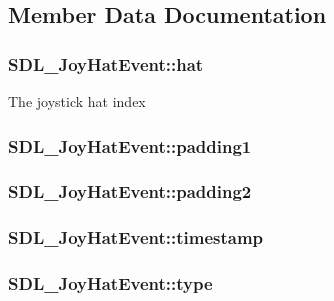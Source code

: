 \subsection{Member Data Documentation}
\hypertarget{struct_s_d_l___joy_hat_event_ab1b54a6d1091e583e856f86b5af1e2f6}{
\subsubsection[{hat}]{ S\-D\-L\-\_\-\-Joy\-Hat\-Event\-::hat}}\label{struct_s_d_l___joy_hat_event_ab1b54a6d1091e583e856f86b5af1e2f6}
The joystick hat index \hypertarget{struct_s_d_l___joy_hat_event_afbe72b6702cf7f70ccbe206737ab2e49}{
\subsubsection[{padding1}]{ S\-D\-L\-\_\-\-Joy\-Hat\-Event\-::padding1}}\label{struct_s_d_l___joy_hat_event_afbe72b6702cf7f70ccbe206737ab2e49}
\hypertarget{struct_s_d_l___joy_hat_event_adaca3e99773130ae456690ba83feb420}{
\subsubsection[{padding2}]{ S\-D\-L\-\_\-\-Joy\-Hat\-Event\-::padding2}}\label{struct_s_d_l___joy_hat_event_adaca3e99773130ae456690ba83feb420}
\hypertarget{struct_s_d_l___joy_hat_event_ade58ecb3e75aad4ef9809f040519a021}{
\subsubsection[{timestamp}]{ S\-D\-L\-\_\-\-Joy\-Hat\-Event\-::timestamp}}\label{struct_s_d_l___joy_hat_event_ade58ecb3e75aad4ef9809f040519a021}
\hypertarget{struct_s_d_l___joy_hat_event_ac583dafab46c44354e210a542aff57cc}{
\subsubsection[{type}]{ S\-D\-L\-\_\-\-Joy\-Hat\-Event\-::type}}\label{struct_s_d_l___joy_hat_event_ac583dafab46c44354e210a542aff57cc}
